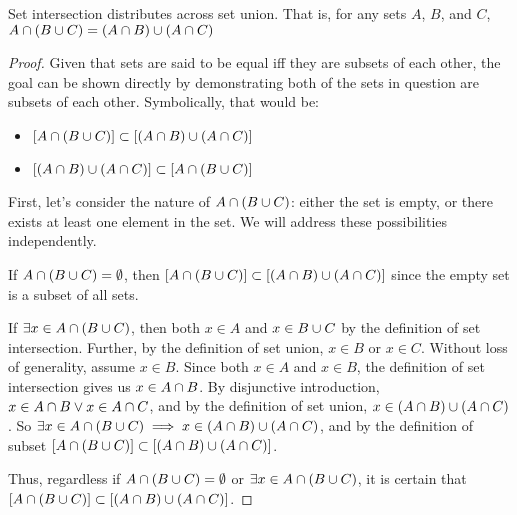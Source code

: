 \documentclass[main.tex]{subfiles}
\begin{document}

\begin{thm}
	Set intersection distributes across set union. That is, for any sets
	\(A\), \(B\), and \(C\),
	\(A \cap (B \cup C) = (A \cap B) \cup (A \cap C)\)
\end{thm}
\begin{proof}
	Given that sets are said to be equal iff they are subsets of each other,
	the goal can be shown directly by demonstrating both of the sets in
	question are subsets of each other. Symbolically, that would be:
	\begin{itemize}
		\item \([A \cap (B \cup C)] \subset [(A \cap B) \cup (A \cap C)]\)
		\item \([(A \cap B) \cup (A \cap C)] \subset [A \cap (B \cup C)]\)
	\end{itemize}

	\medskip
	First, let's consider the nature of \(A \cap (B \cup C)\): either the
	set is empty, or there exists at least one element in the set. We will
	address these possibilities independently.

	If \(A \cap (B \cup C) = \emptyset\), then
	\([A \cap (B \cup C)] \subset [(A \cap B) \cup (A \cap C)]\) since the
	empty set is a subset of all sets.

	If \(\exists x \in A \cap (B \cup C)\), then both \(x \in A\) and
	\(x \in B \cup C\) by the definition of set intersection. Further, by
	the definition of set union, \(x \in B\) or \(x \in C\). Without loss of
	generality, assume \(x \in B\). Since both \(x \in A\) and \(x \in B\),
	the definition of set intersection gives us \(x \in A \cap B\). By
	disjunctive introduction, \(x \in A \cap B \lor x \in A \cap C\), and
	by the definition of set union, \(x \in (A \cap B) \cup (A \cap C)\). So
	\(\exists x \in A \cap (B \cup C) \implies x \in (A \cap B) \cup (A \cap C)\),
	and by the definition of subset
	\([A \cap (B \cup C)] \subset [(A \cap B) \cup (A \cap C)]\).

	Thus, regardless if \(A \cap (B \cup C) = \emptyset\) or
	\(\exists x \in A \cap (B \cup C)\), it is certain that
	\([A \cap (B \cup C)] \subset [(A \cap B) \cup (A \cap C)]\).


\end{proof}
\end{document}
